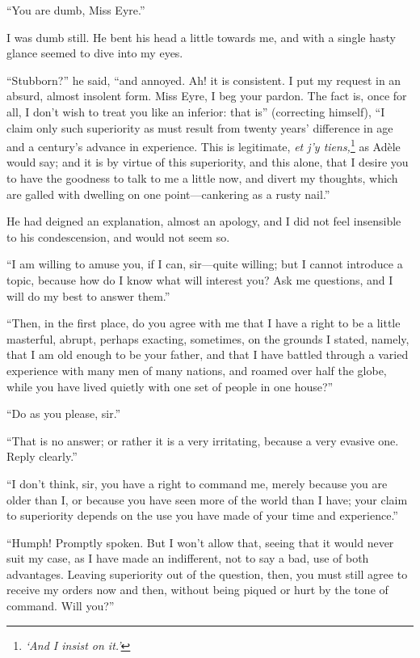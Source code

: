 \enquote{You are dumb, Miss Eyre.}

I was dumb still. He bent his head a little towards me, and with a
single hasty glance seemed to dive into my eyes.

\enquote{Stubborn?} he said, \enquote{and annoyed. Ah! it is
consistent. I put my request in an absurd, almost insolent form. Miss
Eyre, I beg your pardon. The fact is, once for all, I don't wish to
treat you like an inferior: that is} (correcting himself), \enquote{I claim
only such superiority as must result from twenty years' difference in
age and a century's advance in experience. This is legitimate, \emph{\foreignlanguage{french}{et
j'y tiens,}}\footnote{\emph{\enquote{And I insist on it.}}}
as Adèle would say; and it is by virtue of this superiority,
and this alone, that I desire you to have the goodness to talk to me a
little now, and divert my thoughts, which are galled with dwelling on
one point---cankering as a rusty nail.}

He had deigned an explanation, almost an apology, and I did not feel
insensible to his condescension, and would not seem so.

\enquote{I am willing to amuse you, if I can, sir---quite willing; but I
cannot introduce a topic, because how do I know what will interest you? 
Ask me questions, and I will do my best to answer them.}

\enquote{Then, in the first place, do you agree with me that I have a
right to be a little masterful, abrupt, perhaps exacting, sometimes, on
the grounds I stated, namely, that I am old enough to be your father,
and that I have battled through a varied experience with many men of
many nations, and roamed over half the globe, while you have lived
quietly with one set of people in one house?}

\enquote{Do as you please, sir.}

\enquote{That is no answer; or rather it is a very irritating, because a
very evasive one. Reply clearly.}

\enquote{I don't think, sir, you have a right to command me, merely
because you are older than I, or because you have seen more of the world
than I have; your claim to superiority depends on the use you have made
of your time and experience.}

\enquote{Humph! Promptly spoken. But I won't allow that, seeing that
it would never suit my case, as I have made an indifferent, not to say a
bad, use of both advantages. Leaving superiority out of the question,
then, you must still agree to receive my orders now and then, without
being piqued or hurt by the tone of command. Will you?}


